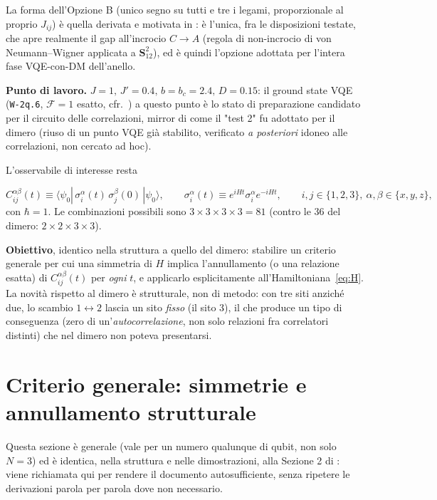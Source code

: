 \documentclass[11pt,a4paper]{article}
\begin{document}
La forma dell'Opzione B (unico segno su tutti e tre i legami, proporzionale al proprio $J_{ij}$)
è quella derivata e motivata in \texttt{}: è l'unica,
fra le disposizioni testate, che apre realmente il gap all'incrocio $C\to A$ (regola di
non-incrocio di von Neumann--Wigner applicata a $\mathbf S_{12}^2$), ed è quindi l'opzione
adottata per l'intera fase VQE-con-DM dell'anello.

\textbf{Punto di lavoro.} $J{=}1,\,J'{=}0.4,\,b{=}b_c{=}2.4,\,D{=}0.15$: il ground state VQE
(\texttt{W-2q.6}, $\mathcal F=1$ esatto, cfr.\ \texttt{})
a questo punto è lo stato di preparazione candidato per il circuito delle correlazioni,
mirror di come il "test 2" fu adottato per il dimero (riuso di un punto VQE già stabilito,
verificato \emph{a posteriori} idoneo alle correlazioni, non cercato ad hoc).

L'osservabile di interesse resta

\begin{equation}
C_{ij}^{\alpha\beta}(t) \equiv \langle\psi_0|\,\sigma_i^\alpha(t)\,\sigma_j^\beta(0)\,|\psi_0\rangle,
\qquad \sigma_i^\alpha(t)\equiv e^{iHt}\sigma_i^\alpha e^{-iHt},
\qquad i,j\in\{1,2,3\},\ \alpha,\beta\in\{x,y,z\},
\label{eq:corr-def}
\end{equation}
con $\hbar=1$. Le combinazioni possibili sono $3\times3\times3\times3=81$ (contro le 36 del
dimero: $2\times2\times3\times3$).

\textbf{Obiettivo}, identico nella struttura a quello del dimero: stabilire un criterio generale
per cui una simmetria di $H$ implica l'annullamento (o una relazione esatta) di
$C_{ij}^{\alpha\beta}(t)$ per \emph{ogni} $t$, e applicarlo esplicitamente
all'Hamiltoniana~\eqref{eq:H}. La novità rispetto al dimero è strutturale, non di metodo: con
tre siti anziché due, lo scambio $1\leftrightarrow2$ lascia un sito \emph{fisso} (il sito 3), il
che produce un tipo di conseguenza (zero di un'\emph{autocorrelazione}, non solo relazioni fra
correlatori distinti) che nel dimero non poteva presentarsi.

\section{Criterio generale: simmetrie e annullamento strutturale}

Questa sezione è generale (vale per un numero qualunque di qubit, non solo $N=3$) ed è identica,
nella struttura e nelle dimostrazioni, alla Sezione 2 di
\texttt{}: viene richiamata qui per rendere il
documento autosufficiente, senza ripetere le derivazioni parola per parola dove non necessario.
\end{document}

